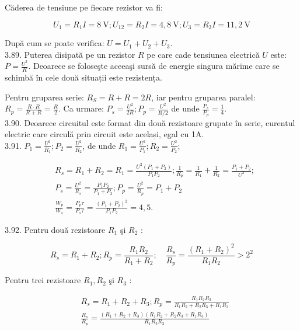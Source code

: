 \documentclass[10pt]{article}
\begin{document}
Căderea de tensiune pe fiecare rezistor va fi:

$$
U_{1}=R_{1} I=8 \mathrm{~V} ; U_{12}=R_{2} I=4,8 \mathrm{~V} ; U_{3}=R_{3} I=11,2 \mathrm{~V}
$$

După cum se poate verifica: $U=U_{1}+U_{2}+U_{3}$.\\
3.89. Puterea disipată pe un rezistor $R$ pe care cade tensiunea electrică $U$ este: $P=\frac{U^{2}}{R}$. Deoarece se foloseşte aceeaşi sursă de energie singura mărime care se schimbă în cele două situații este rezistența.

Pentru gruparea serie: $R_{S}=R+R=2 R$, iar pentru gruparea paralel: $R_{p}=\frac{R \cdot R}{R+R}=\frac{R}{2}$. Ca urmare: $P_{s}=\frac{U^{2}}{2 R} ; P_{p}=\frac{U^{2}}{R / 2}$ de unde $\frac{P_{s}}{P_{p}}=\frac{1}{4}$.\\
3.90. Deoarece circuitul este format din două rezistoare grupate în serie, curentul electric care circulă prin circuit este același, egal cu 1A.\\
3.91. $P_{1}=\frac{U^{2}}{R_{1}} ; P_{2}=\frac{U^{2}}{R_{2}}$, de unde $R_{1}=\frac{U^{2}}{P_{1}} ; R_{2}=\frac{U^{2}}{P_{2}}$;

$$
\begin{aligned}
& R_{s}=R_{1}+R_{2}=R_{1}=\frac{U^{2}\left(P_{1}+P_{2}\right)}{P_{1} P_{2}} ; \frac{1}{R_{p}}=\frac{1}{R_{1}}+\frac{1}{R_{2}}=\frac{P_{1}+P_{2}}{U^{2}} ; \\
& P_{s}=\frac{U^{2}}{R_{s}}=\frac{P_{1} P_{2}}{P_{1}+P_{2}} ; P_{p}=\frac{U^{2}}{R_{p}}=P_{1}+P_{2} \\
& \frac{W_{p}}{W_{s}}=\frac{P_{p} \tau}{P_{s} \tau}=\frac{\left(P_{1}+P_{2}\right)^{2}}{P_{1} P_{2}}=4,5 .
\end{aligned}
$$

3.92. Pentru două rezistoare $R_{1}$ şi $R_{2}$ :

$$
R_{s}=R_{1}+R_{2} ; R_{p}=\frac{R_{1} R_{2}}{R_{1}+R_{2}} ; \quad \frac{R_{s}}{R_{p}}=\frac{\left(R_{1}+R_{2}\right)^{2}}{R_{1} R_{2}}>2^{2}
$$

Pentru trei rezistoare $R_{1}, R_{2}$ şi $R_{3}$ :

$$
\begin{aligned}
& R_{s}=R_{1}+R_{2}+R_{3} ; R_{p}=\frac{R_{1} R_{2} R_{3}}{R_{1} R_{2}+R_{2} R_{3}+R_{1} R_{3}} \\
& \frac{R_{s}}{R_{p}}=\frac{\left(R_{1}+R_{2}+R_{3}\right)\left(R_{1} R_{2}+R_{2} R_{3}+R_{1} R_{3}\right)}{R_{1} R_{2} R_{3}}
\end{aligned}
$$
\end{document}
